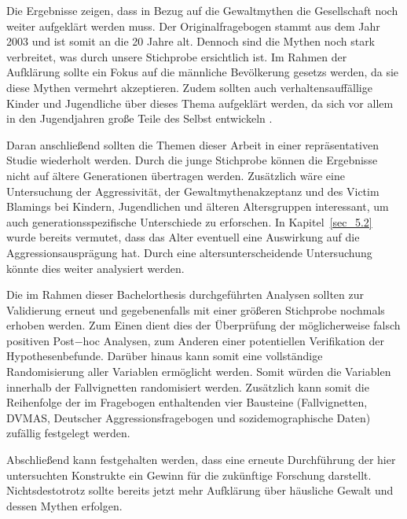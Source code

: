 Die Ergebnisse zeigen, dass in Bezug auf die Gewaltmythen die Gesellschaft noch weiter aufgeklärt werden muss. Der Originalfragebogen stammt aus dem Jahr 2003 und ist somit an die 20 Jahre alt. Dennoch sind die Mythen noch stark verbreitet, was durch unsere Stichprobe ersichtlich ist. Im Rahmen der Aufklärung sollte ein Fokus auf die männliche Bevölkerung gesetzs werden, da sie diese Mythen vermehrt akzeptieren. Zudem sollten auch verhaltensauffällige Kinder und Jugendliche über dieses Thema aufgeklärt werden, da sich vor allem in den Jugendjahren große Teile des Selbst entwickeln \parencite{H1_Entwicklung}.

Daran anschließend sollten die Themen dieser Arbeit in einer repräsentativen Studie wiederholt werden. Durch die junge Stichprobe können die Ergebnisse nicht auf ältere Generationen übertragen werden. Zusätzlich wäre eine Untersuchung der Aggressivität, der Gewaltmythenakzeptanz und des Victim Blamings bei Kindern, Jugendlichen und älteren Altersgruppen interessant, um auch generationsspezifische Unterschiede zu erforschen. In Kapitel~\ref{sec_5.2} wurde bereits vermutet, dass das Alter eventuell eine Auswirkung auf die Aggressionsausprägung hat. Durch eine altersunterscheidende Untersuchung könnte dies weiter analysiert werden. 

Die im Rahmen dieser Bachelorthesis durchgeführten Analysen sollten zur Validierung erneut und gegebenenfalls mit einer größeren Stichprobe nochmals erhoben werden. Zum Einen dient dies der Überprüfung der möglicherweise falsch positiven Post$-$hoc Analysen, zum Anderen einer potentiellen Verifikation der Hypothesenbefunde. Darüber hinaus kann somit eine vollständige Randomisierung aller Variablen ermöglicht werden. Somit würden die Variablen innerhalb der Fallvignetten randomisiert werden. Zusätzlich kann somit die Reihenfolge der im Fragebogen enthaltenden vier Bausteine (Fallvignetten, DVMAS, Deutscher Aggressionsfragebogen und sozidemographische Daten) zufällig festgelegt werden. 


Abschließend kann festgehalten werden, dass eine erneute Durchführung der hier untersuchten Konstrukte ein Gewinn für die zukünftige Forschung darstellt. Nichtsdestotrotz sollte bereits jetzt mehr Aufklärung über häusliche Gewalt und dessen Mythen erfolgen.
